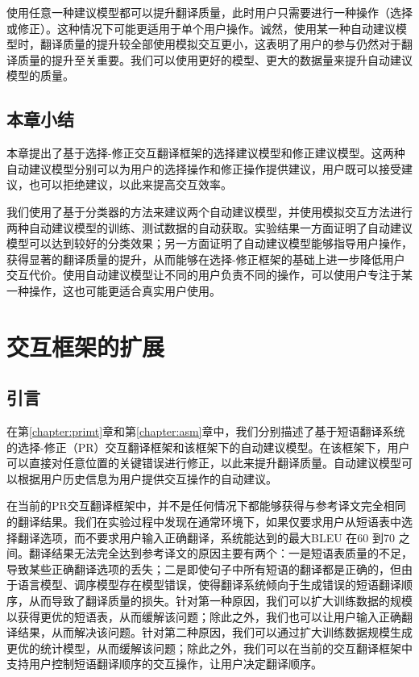 \documentclass[master, winfont]{njuthesis}
\begin{document}
使用任意一种建议模型都可以提升翻译质量，此时用户只需要进行一种操作（选择或修正）。这种情况下可能更适用于单个用户操作。诚然，使用某一种自动建议模型时，翻译质量的提升较全部使用模拟交互更小，这表明了用户的参与仍然对于翻译质量的提升至关重要。我们可以使用更好的模型、更大的数据量来提升自动建议模型的质量。
\section{本章小结}
本章提出了基于选择-修正交互翻译框架的选择建议模型和修正建议模型。这两种自动建议模型分别可以为用户的选择操作和修正操作提供建议，用户既可以接受建议，也可以拒绝建议，以此来提高交互效率。

我们使用了基于分类器的方法来建议两个自动建议模型，并使用模拟交互方法进行两种自动建议模型的训练、测试数据的自动获取。实验结果一方面证明了自动建议模型可以达到较好的分类效果；另一方面证明了自动建议模型能够指导用户操作，获得显著的翻译质量的提升，从而能够在选择-修正框架的基础上进一步降低用户交互代价。使用自动建议模型让不同的用户负责不同的操作，可以使用户专注于某一种操作，这也可能更适合真实用户使用。
\chapter{交互框架的扩展}
\label{chapter:frameworkExpand}
\section{引言}
在第\ref{chapter:primt}章和第\ref{chapter:asm}章中，我们分别描述了基于短语翻译系统的选择-修正（PR）交互翻译框架和该框架下的自动建议模型。在该框架下，用户可以直接对任意位置的关键错误进行修正，以此来提升翻译质量。自动建议模型可以根据用户历史信息为用户提供交互操作的自动建议。

在当前的PR交互翻译框架中，并不是任何情况下都能够获得与参考译文完全相同的翻译结果。我们在实验过程中发现在通常环境下，如果仅要求用户从短语表中选择翻译选项，而不要求用户输入正确翻译，系统能达到的最大BLEU 在60 到70 之间。翻译结果无法完全达到参考译文的原因主要有两个：一是短语表质量的不足，导致某些正确翻译选项的丢失；二是即使句子中所有短语的翻译都是正确的，但由于语言模型、调序模型存在模型错误，使得翻译系统倾向于生成错误的短语翻译顺序，从而导致了翻译质量的损失。针对第一种原因，我们可以扩大训练数据的规模以获得更优的短语表，从而缓解该问题；除此之外，我们也可以让用户输入正确翻译结果，从而解决该问题。针对第二种原因，我们可以通过扩大训练数据规模生成更优的统计模型，从而缓解该问题；除此之外，我们可以在当前的交互翻译框架中支持用户控制短语翻译顺序的交互操作，让用户决定翻译顺序。
\end{document}
